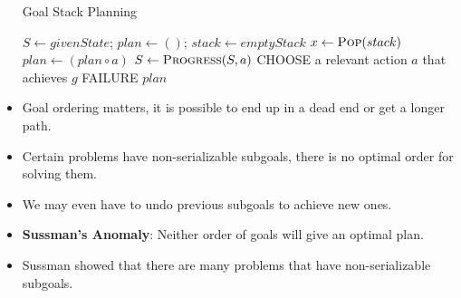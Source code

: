 \documentclass[a4paper]{article}
\begin{document}
\begin{itemize}
\begin{algorithm}[H]
        \caption{Goal Stack Planning}\label{alg:AI-GSP}
        \begin{algorithmic}[1]
            \Statex {}
            \State $S\gets givenState$; $plan\gets ()$; $stack\gets emptyStack$
            \State {}
                \State $x\gets \Call{Pop}{stack}$
                    \State $plan\gets (plan\circ a)$
                    \State $S\gets \Call{Progress}{S,a}$
                    \State {}
                    \State CHOOSE a relevant action $a$ that achieves $g$
                        \State \Return FAILURE 
                    \EndIf
                    \State {}
                    \State {}
                \EndIf
            \EndWhile
            \State \Return $plan$
        \end{algorithmic}
    \end{algorithm}
    \item Goal ordering matters, it is possible to end up in a dead end or get a longer path.
    \item Certain problems have non-serializable subgoals, there is no optimal order for solving them.
    \item We may even have to undo previous subgoals to achieve new ones.
    \item \textbf{Sussman's Anomaly}: Neither order of goals will give an optimal plan.
    \item Sussman showed that there are many problems that have non-serializable subgoals.
\end{itemize}
\pagebreak
\end{document}
